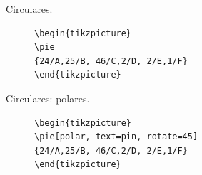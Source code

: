 \documentclass[dvipsnames,xcolor=x11names]{beamer}
\theoremstyle{plain}
\theoremstyle{definition}
\begin{document}
\begin{frame}[fragile]{Circulares.}
\begin{figure}
\begin{minipage}{0.4\linewidth}
\hspace*{-3cm}\begin{scriptsize}
\begin{verbatim}
\begin{tikzpicture}
\pie
{24/A,25/B, 46/C,2/D, 2/E,1/F}
\end{tikzpicture}
\end{verbatim}
\end{scriptsize}
\end{minipage}
\begin{minipage}{0.4\linewidth}
\centering
{}
\end{minipage}
    \end{figure}
\end{frame}

\begin{frame}[fragile]{Circulares: polares.}
\begin{figure}
\begin{minipage}{0.4\linewidth}
\hspace*{-3cm}\begin{scriptsize}
\begin{verbatim}
\begin{tikzpicture}
\pie[polar, text=pin, rotate=45]
{24/A,25/B, 46/C,2/D, 2/E,1/F}
\end{tikzpicture}
\end{verbatim}
\end{scriptsize}
\end{minipage}
\begin{minipage}{0.4\linewidth}
\centering
{}
\end{minipage}
    \end{figure}
\end{frame}
\end{document}

